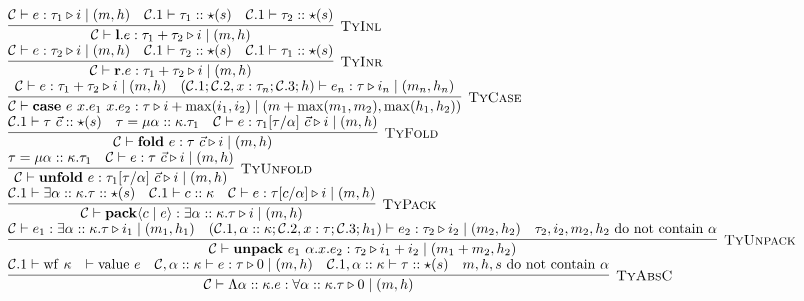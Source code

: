 \documentclass[fleqn]{article}
\begin{document}
\[\begin{array}{l}
	\infer[\textsc{TyInl}]{\jtygc{\mathcal{C} }{ \mathbf{l}.e }{ \tau_1 + \tau_2 }{ i }{ m}{h}}{\jtygc{\mathcal{C} }{ e }{ \tau_1 }{ i }{ m }{h} & \mathcal{C}.1 \vdash \tau_1 :: \star(s) & \mathcal{C}.1 \vdash \tau_2 :: \star(s)} \\
	
	\infer[\textsc{TyInr}]{\jtygc{\mathcal{C} }{ \mathbf{r}.e }{ \tau_1 + \tau_2 }{ i }{ m}{h}}{\jtygc{\mathcal{C} }{ e }{ \tau_2 }{ i }{ m }{h} & \mathcal{C}.1 \vdash \tau_2 :: \star(s) & \mathcal{C}.1 \vdash \tau_1 :: \star(s)} \\
	
	\infer[\textsc{TyCase}]{\jtygc{\mathcal{C} }{ \mathbf{case}~e~x.e_1~x.e_2 }{ \tau }{ i + \max(i_1,i_2) }{ m + \max(m_1,m_2)}{\max(h_1,h_2)}}{\jtygc{\mathcal{C}}{e}{ \tau_1 + \tau_2 }{ i }{ m}{h} & \jtygc{(\mathcal{C}.1;\mathcal{C}.2,x:\tau_n;\mathcal{C}.3;h) }{ e_n }{ \tau }{ i_n }{ m_n}{h_n}} \\
	
	\infer[\textsc{TyFold}]{\jtygc{\mathcal{C} }{ \mathbf{fold}~e }{ \tau~\vec{c} }{ i }{ m}{h}}{\mathcal{C}.1 \vdash \tau~\vec{c} :: \star(s) & \tau = \mu \alpha :: \kappa. \tau_1 & \jtygc{\mathcal{C} }{ e }{\tau_1[\tau/\alpha]~\vec{c} }{ i }{ m}{h}} \\
	
	\infer[\textsc{TyUnfold}]{\jtygc{\mathcal{C} }{ \mathbf{unfold}~e }{ \tau_1[\tau/\alpha]~\vec{c} }{ i }{ m}{h}}{\tau = \mu \alpha :: \kappa. \tau_1 & \jtygc{\mathcal{C} }{ e }{ \tau~\vec{c} }{ i }{ m}{h}} \\
	
	\infer[\textsc{TyPack}]{\jtygc{\mathcal{C} }{ \mathbf{pack}\langle c \mid e \rangle }{ \exists \alpha :: \kappa. \tau }{ i }{ m}{h}}{\mathcal{C}.1 \vdash \exists \alpha :: \kappa. \tau :: \star(s) & \mathcal{C}.1 \vdash c :: \kappa & \jtygc{\mathcal{C} }{ e }{ \tau[c/\alpha] }{ i }{ m}{h}} \\
	
	\infer[\textsc{TyUnpack}]{\jtygc{\mathcal{C} }{ \mathbf{unpack}~e_1~\alpha.x.e_2 }{ \tau_2 }{ i_1 + i_2 }{ m_1 + m_2}{h_2}}{\jtygc{\mathcal{C} }{ e_1 }{ \exists \alpha :: \kappa. \tau }{ i_1 }{ m_1}{h_1} & \jtygc{(\mathcal{C}.1,\alpha::\kappa;\mathcal{C}.2,x:\tau;\mathcal{C}.3;h_1) }{ e_2 }{ \tau_2 }{ i_2 }{ m_2}{h_2} & \tau_2,i_2,m_2,h_2~\mathrm{do~not~contain}~\alpha} \\
	
	\infer[\textsc{TyAbsC}]{\jtygc{\mathcal{C} }{ \Lambda \alpha :: \kappa. e }{\forall \alpha :: \kappa. \tau }{ 0 }{ m}{h}}{\mathcal{C}.1 \vdash \mathrm{wf}~\kappa & \vdash \mathrm{value}~e & \jtygc{\mathcal{C},\alpha :: \kappa }{ e }{ \tau }{ 0 }{ m }{h} & \mathcal{C}.1,\alpha :: \kappa \vdash \tau :: \star(s) & m,h,s~\mathrm{do~not~contain}~\alpha} \\
	

\end{array}\]
\end{document}
